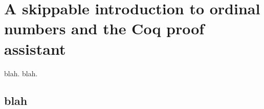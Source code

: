 \chapter[Skippable chapter]{A skippable introduction to ordinal numbers and the Coq proof assistant}


blah.    blah.


\section{blah}

